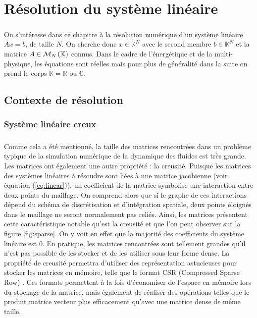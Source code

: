 \chapter{Résolution du système linéaire}

\paragraph{}
On s'intéresse dans ce chapitre à la résolution numérique d'un système linéaire $Ax = b$, de taille $N$.
On cherche donc $x\in\mathbb{K}^N$ avec le second membre $b\in\mathbb{K}^N$ et la matrice $A\in\mathcal{M}_{N}\left(\mathbb{K}\right)$ connus.
Dans le cadre de l'énergétique et de la multi-physique, les équations sont réelles mais pour plus de généralité dans la suite on prend le corps $\mathbb{K} = \mathbb{R}\textrm{ ou }\mathbb{C}$.


\section{Contexte de résolution}

  \subsection{Système linéaire creux}

    \paragraph{}
		Comme cela a été mentionné, la taille des matrices rencontrées dans un problème typique de la simulation numérique de la dynamique des fluides est très grande.
		Les matrices ont également une autre propriété : la creusité.
		Puisque les matrices des systèmes linéaires à résoudre sont liées à une matrice jacobienne (voir équation (\ref{eq:linear})), un coefficient de la matrice symbolise une interaction entre deux points du maillage.
		On comprend alors que si le graphe de ces interactions dépend du schéma de discrétisation et d'intégration spatiale, deux points éloignés dans le maillage ne seront normalement pas reliés.
		Ainsi, les matrices présentent cette caractéristique notable qu'est la creusité et que l'on peut observer sur la figure \ref{fig:sparse}.
		On y voit en effet que la majorité des coefficients du système linéaire est 0.
		En pratique, les matrices rencontrées sont tellement grandes qu'il n'est pas possible de les stocker et de les utiliser sous leur forme dense.
		La propriété de creusité permettra d'utiliser des représentation astucieuses pour stocker les matrices en mémoire, telle que le format CSR (Compressed Sparse Row) \cite{Saad2003}.
		Ces formats permettent à la fois d'économiser de l'espace en mémoire lors du stockage de la matrice, mais également de réaliser des opérations telles que le produit matrice vecteur plus efficacement qu'avec une matrice dense de même taille.

